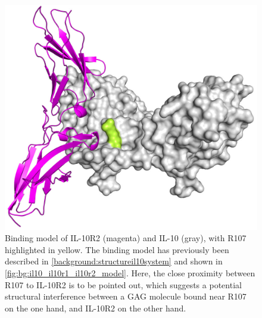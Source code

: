 \begin{figure}
\centering
\includegraphics[width=1.0\textwidth]{gfx/together/il10dimer_surface_r2cartoon_r107_01.jpg}
\caption[]{
Binding model of IL-10R2 (magenta) and IL-10 (gray), with R107 highlighted in
yellow. The binding model has previously been described in
\cref{background:structureil10system} and shown in
\cref{fig:bg:il10_il10r1_il10r2_model}. Here, the close proximity between R107
to IL-10R2 is to be pointed out, which suggests a potential structural
interference between a GAG molecule bound near R107 on the one hand, and IL-10R2
on the other hand.}
\label{fig:together:r2impaired}
\end{figure}
